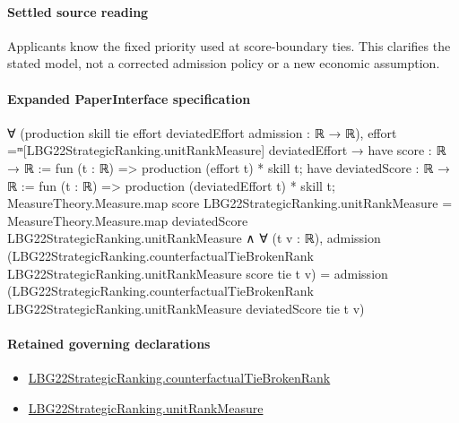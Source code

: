 \documentclass[10pt]{article}
\begin{document}
\paragraph{Settled source reading}
\begin{sloppypar}
Applicants know the fixed priority used at score-\allowbreak{}boundary ties.\allowbreak{} This clarifies the stated model, not a corrected admission policy or a new economic assumption.\allowbreak{}
\end{sloppypar}

\paragraph{Expanded PaperInterface specification}
\begin{ReviewVerbatim}
∀ (production skill tie effort deviatedEffort admission : ℝ → ℝ),
  effort =ᵐ[LBG22StrategicRanking.unitRankMeasure] deviatedEffort →
    have score : ℝ → ℝ := fun (t : ℝ) => production (effort t) * skill t;
    have deviatedScore : ℝ → ℝ := fun (t : ℝ) => production (deviatedEffort t) * skill t;
    MeasureTheory.Measure.map score LBG22StrategicRanking.unitRankMeasure =
        MeasureTheory.Measure.map deviatedScore LBG22StrategicRanking.unitRankMeasure ∧
      ∀ (t v : ℝ),
        admission
            (LBG22StrategicRanking.counterfactualTieBrokenRank LBG22StrategicRanking.unitRankMeasure score tie t v) =
          admission
            (LBG22StrategicRanking.counterfactualTieBrokenRank LBG22StrategicRanking.unitRankMeasure deviatedScore tie t
              v)
\end{ReviewVerbatim}

\paragraph{Retained governing declarations}
\begin{itemize}\raggedright
\item \hyperlink{paper-prerequisite-6ed45e46d01eadeb}{LBG22\allowbreak{}Strategic\allowbreak{}Ranking.\allowbreak{}counterfactual\allowbreak{}Tie\allowbreak{}Broken\allowbreak{}Rank}
\item \hyperlink{governing-declaration-678cf48d549cb620}{LBG22\allowbreak{}Strategic\allowbreak{}Ranking.\allowbreak{}unit\allowbreak{}Rank\allowbreak{}Measure}
\end{itemize}
\end{document}
